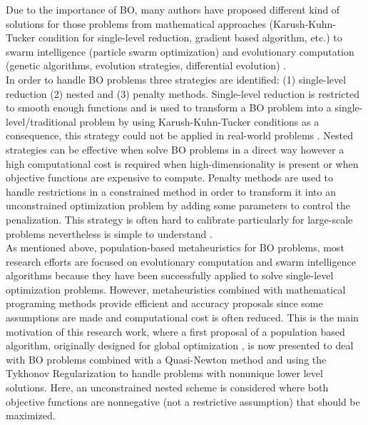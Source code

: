 \documentclass[conference]{IEEEtran}
\theoremstyle{definition}
\begin{document}
Due to the importance of BO, many authors have proposed different kind of solutions
for those problems from mathematical approaches (Karush-Kuhn-Tucker condition for
single-level reduction, gradient based algorithm, etc.) \cite{dempe2002foundations,shi2005extended}
to swarm intelligence (particle swarm optimization) and evolutionary computation
(genetic algorithms, evolution strategies, differential evolution)
\cite{derrac2011practical,angelo2013differential,li2006hierarchical}.\\

In order to handle BO problems three strategies are identified: (1) single-level
reduction (2) nested and (3) penalty methods. Single-level reduction is restricted
to smooth enough functions and is used to transform a BO problem into a single-level/traditional
problem by using Karush-Kuhn-Tucker conditions as a consequence, this strategy
could not be applied in real-world problems  \cite{dempe2002foundations,colson2007overview}. %
Nested strategies can be effective when solve BO problems in a direct way  however
a high computational cost is required when high-dimensionality is present or when
objective functions are expensive to compute. Penalty methods are used to handle
restrictions in a constrained method in order to transform it into an unconstrained
optimization problem by adding some parameters to control the penalization. This 
strategy is often hard to calibrate particularly for large-scale problems nevertheless
is simple to understand \cite{savard1994steepest,white1993penalty}.\\

As mentioned above, population-based metaheuristics for BO problems, most research
efforts are focused on evolutionary computation and swarm intelligence algorithms
because they have been successfully applied to solve single-level optimization problems.
However, metaheuristics combined with mathematical programing methods provide
efficient and accuracy proposals since some assumptions are made and computational
cost is often reduced. This is the main motivation of this research work, where a
first proposal of a population based algorithm, originally designed for global
optimization \cite{Mejia2018}, is now presented to deal with BO problems combined
with a Quasi-Newton method and using the Tykhonov Regularization to handle problems
with nonunique lower level solutions. Here, an unconstrained nested scheme is
considered where both objective functions are nonnegative (not a restrictive assumption)
that should be maximized.
\end{document}
